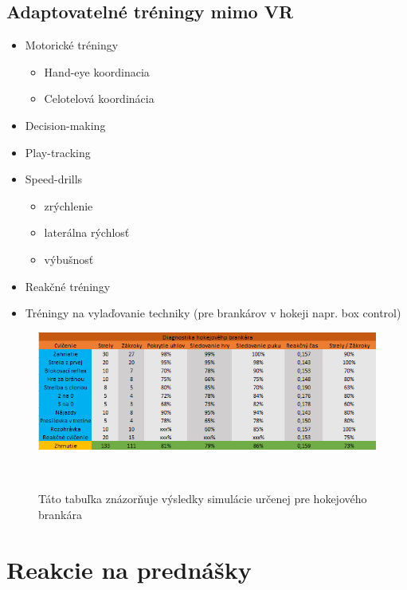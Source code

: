 \documentclass[10pt,twoside,slovak,a4paper]{article}										%
\begin{document}
\subsection{Adaptovatelné tréningy mimo VR} 

\begin{itemize}
\item Motorické tréningy
	\begin{itemize}
	\item Hand-eye koordinacia       
	\item Celotelová koordinácia
	\end{itemize}	
\item Decision-making
\item Play-tracking
\item Speed-drills
	\begin{itemize}
	\item zrýchlenie
	\item laterálna rýchlosť
	\item výbušnosť
	\end{itemize}
\item Reakčné tréningy
\item Tréningy na vylaďovanie techniky (pre brankárov v hokeji napr. box control)
\end{itemize}

\begin{figure}[htbp]
\centering
\includegraphics[scale=0.6]{tabulka.png}
\caption{Táto tabuľka znázorňuje výsledky simulácie určenej pre hokejového brankára}  ~\cite{Hlavny:zdroj}
\label{fig}
\end{figure}

\section{Reakcie na prednášky}
\end{document}
